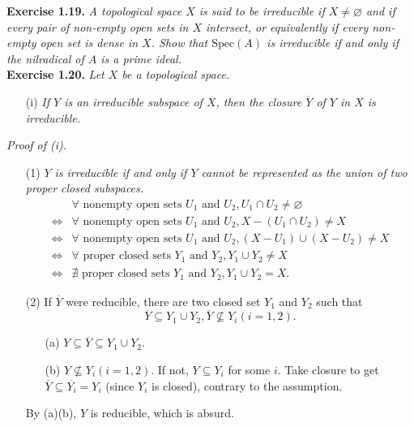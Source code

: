 \documentclass{article}
\begin{document}



\textbf{Exercise 1.19.}
\emph{A topological space $X$ is said to be irreducible if
$X \neq \varnothing$ and if every pair of non-empty open sets in $X$ intersect, or
equivalently if every non-empty open set is dense in $X$.
Show that $\text{Spec}(A)$ is irreducible if and only if
the nilradical of $A$ is a prime ideal.} \\






\textbf{Exercise 1.20.}
\emph{Let $X$ be a topological space.}
\begin{enumerate}
\item[(i)]
\emph{If $Y$ is an irreducible subspace of $X$, then the closure $\overline{Y}$
of $Y$ in $X$ is irreducible.}
\end{enumerate}

\emph{Proof of (i).}
\begin{enumerate}
\item[(1)]
\emph{$Y$ is irreducible if and only if
$Y$ cannot be represented as the union of two proper closed subspaces.}
  \begin{align*}
  &\forall \text{ nonempty open sets } U_1 \text{ and } U_2,
  U_1 \cap U_2 \neq \varnothing \\
  \Longleftrightarrow&
  \forall \text{ nonempty open sets } U_1 \text{ and } U_2,
  X - (U_1 \cap U_2) \neq X \\
  \Longleftrightarrow&
  \forall \text{ nonempty open sets } U_1 \text{ and } U_2,
  (X - U_1) \cup (X - U_2) \neq X \\
  \Longleftrightarrow&
  \forall \text{ proper closed sets } Y_1 \text{ and } Y_2,
  Y_1 \cup Y_2 \neq X \\
  \Longleftrightarrow&
  \nexists \text{ proper closed sets } Y_1 \text{ and } Y_2,
  Y_1 \cup Y_2 = X.
  \end{align*}
\item[(2)]
If $\overline{Y}$ were reducible, there are two closed set $Y_1$ and $Y_2$
such that
$$\overline{Y} \subseteq Y_1 \cup Y_2,
\overline{Y} \not\subseteq Y_i (i = 1, 2).$$
  \begin{enumerate}
  \item[(a)]
  $Y \subseteq \overline{Y} \subseteq Y_1 \cup Y_2$.
  \item[(b)]
  $Y\not\subseteq Y_i (i = 1, 2)$. If not, $Y \subseteq Y_i$ for some $i$.
  Take closure to get $\overline{Y} \subseteq \overline{Y_i} = Y_i$ (since $Y_i$ is closed),
  contrary to the assumption.
  \end{enumerate}
  By (a)(b), $Y$ is reducible, which is absurd.
\end{enumerate}
\end{document}
